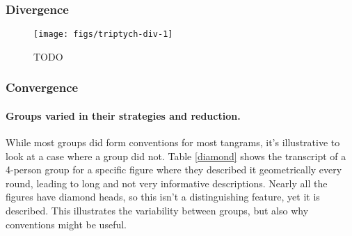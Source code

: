 \documentclass[
  english,
  a4paper,
]{article}
\begin{document}
\hypertarget{divergence}{%
\subsubsection{Divergence}\label{divergence}}

\begin{figure*}[t!]

{\centering \texttt{[image: figs/triptych-div-1]} 

}

\caption{TODO}\label{fig:triptych-div}
\end{figure*}

\hypertarget{convergence}{%
\subsubsection{Convergence}\label{convergence}}

\hypertarget{groups-varied-in-their-strategies-and-reduction.}{%
\paragraph{Groups varied in their strategies and reduction.}\label{groups-varied-in-their-strategies-and-reduction.}}

While most groups did form conventions for most tangrams, it's illustrative to look at a case where a group did not. Table \ref{diamond} shows the transcript of a 4-person group for a specific figure where they described it geometrically every round, leading to long and not very informative descriptions. Nearly all the figures have diamond heads, so this isn't a distinguishing feature, yet it is described. This illustrates the variability between groups, but also why conventions might be useful.
\end{document}
